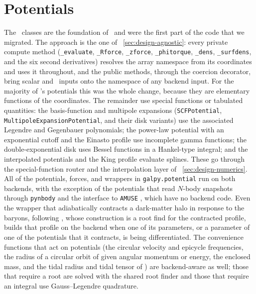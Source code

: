 \section{Potentials}\label{sec:potential}

The \pot\ classes are the foundation of \galpy\ and were the first part
of the code that we migrated. The approach is the one of
\sectionname~\ref{sec:design-agnostic}: every private compute method
(\texttt{\_evaluate}, \texttt{\_Rforce}, \texttt{\_zforce},
\texttt{\_phitorque}, \texttt{\_dens}, \texttt{\_surfdens}, and the six
second derivatives) resolves the array namespace from its coordinates
and uses it throughout, and the public methods, through the coercion
decorator, bring scalar and \numpy\ inputs onto the namespace of any
backend input. For the majority of \galpy's potentials this was the
whole change, because they are elementary functions of the coordinates.
The remainder use special functions or tabulated quantities: the
basis-function and multipole expansions (\texttt{SCFPotential},
\texttt{MultipoleExpansionPotential}, and their disk variants) use the
associated Legendre and Gegenbauer polynomials; the power-law potential
with an exponential cutoff and the Einasto profile use incomplete gamma
functions; the double-exponential disk uses Bessel functions in a
Hankel-type integral; and the interpolated potentials and the King
profile evaluate splines. These go through the special-function router
and the interpolation layer of \sectionname~\ref{sec:design-numerics}.
All of the potentials, forces, and wrappers in \texttt{galpy.potential}
run on both backends, with the exception of the potentials that read
$N$-body snapshots through \texttt{pynbody} \citep{Pontzen2013} and
the interface \citep{Webb2020} to \texttt{AMUSE}
\citep{PortegiesZwart2009,Pelupessy2013,PortegiesZwart2018}, which
have no backend code. Even the wrapper that adiabatically contracts a
dark-matter halo in response to the baryons, following
\citet{Cautun2020}, whose construction is a root find for the
contracted profile, builds that profile on the backend when one of its parameters, or a parameter of
one of the potentials that it contracts, is being differentiated. The
convenience functions that act on potentials (the circular velocity
and epicycle frequencies, the radius of a circular orbit of given
angular momentum or energy, the enclosed mass, and the tidal radius
and tidal tensor of \citealt{Webb2019}) are backend-aware as well;
those that require a root are solved with the shared root finder and
those that require an integral use Gauss--Legendre quadrature.

